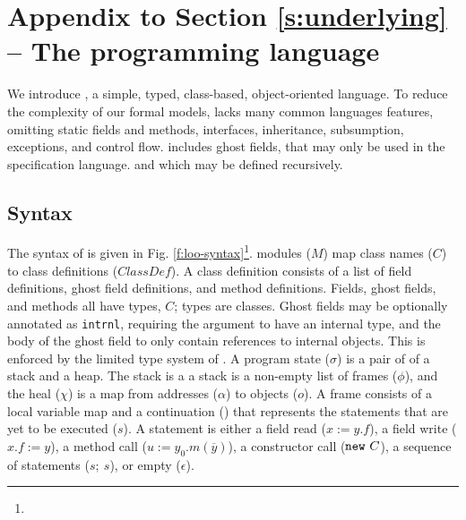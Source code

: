\section{Appendix to Section \ref{s:underlying} -- The programming language \LangOO}
\label{app:loo}


We introduce \LangOO, a simple, typed, class-based, object-oriented language.
To reduce the complexity of our formal models, \LangOO lacks many
common languages features, omitting static fields and methods, interfaces,
inheritance, subsumption, exceptions, and control flow.  
 \LangOO includes ghost fields,  that may only be used in the specification language.
and which may be defined recursively.
%


\subsection{Syntax}

The syntax of \LangOO is given in Fig. \ref{f:loo-syntax}\footnote{}.
\LangOO modules ($M$) map class names ($C$) to class definitions ($\textit{ClassDef}$).
A class definition consists of %
a list of field definitions, ghost field definitions, and method definitions.
{Fields, ghost fields, and methods all have types, $C$; {types are
    classes}.
    Ghost fields may be optionally 
 annotated as \texttt{intrnl}, requiring the argument to have an internal type, and the 
body of the ghost field to only contain references to internal objects. This is enforced by the
limited type system of \LangOO.}
A program state ($\sigma$) is a pair of of a stack and a heap.
The stack is a a stack is a non-empty list of frames ($\phi$), and the heal ($\chi$)
is a map from addresses ($\alpha$) to objects ($o$). A frame consists of a local variable
map and a continuation () that represents the statements that are yet to be executed ($s$).
A statement is either a field read ($x := y.f$), a field write ($x.f := y$), a method call
($u :=y_0.m(\overline{y})$), a constructor call ($\mbox{\normalfont{\texttt{new}}}\ C$), 
  a sequence of statements ($s;\ s$),
  or empty ($\epsilon$).


